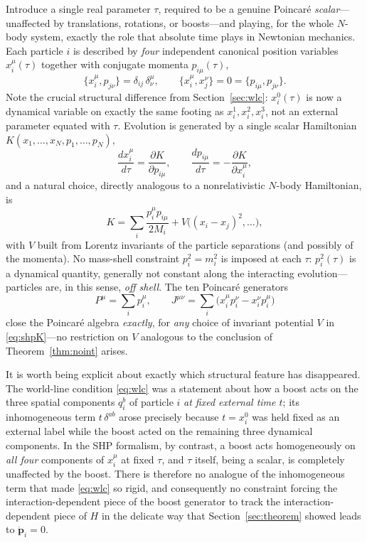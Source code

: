 Introduce a single real parameter $\tau$, required to be a genuine Poincar\'e
\emph{scalar}---unaffected by translations, rotations, or boosts---and playing,
for the whole $N$-body system, exactly the role that absolute time plays in
Newtonian mechanics. Each particle $i$ is described by \emph{four} independent
canonical position variables $x_i^\mu(\tau)$ together with conjugate momenta
$p_{i\mu}(\tau)$,
\begin{equation}
\{x_i^\mu,p_{j\nu}\} = \delta_{ij}\,\delta^\mu_\nu, \qquad \{x_i^\mu,x_j^\nu\}=0=\{p_{i\mu},p_{j\nu}\}.
\end{equation}
Note the crucial structural difference from Section~\ref{sec:wlc}:
$x_i^0(\tau)$ is now a dynamical variable on exactly the same footing as
$x_i^1,x_i^2,x_i^3$, not an external parameter equated with $\tau$. Evolution
is generated by a single scalar Hamiltonian $K(x_1,\dots,x_N,p_1,\dots,p_N)$,
\begin{equation}
\frac{dx_i^\mu}{d\tau} = \frac{\partial K}{\partial p_{i\mu}}, \qquad \frac{dp_{i\mu}}{d\tau} = -\frac{\partial K}{\partial x_i^\mu},
\end{equation}
and a natural choice, directly analogous to a nonrelativistic $N$-body Hamiltonian, is
\begin{equation}
K = \sum_i \frac{p_i^\mu p_{i\mu}}{2M_i} + V\big((x_i-x_j)^2,\dots\big),
\label{eq:shpK}
\end{equation}
with $V$ built from Lorentz invariants of the particle separations (and
possibly of the momenta). No mass-shell constraint $p_i^2=m_i^2$ is imposed at
each $\tau$: $p_i^2(\tau)$ is a dynamical quantity, generally not constant
along the interacting evolution---particles are, in this sense, \emph{off
shell}. The ten Poincar\'e generators
\begin{equation}
P^\mu=\sum_i p_i^\mu, \qquad J^{\mu\nu}=\sum_i\big(x_i^\mu p_i^\nu - x_i^\nu p_i^\mu\big)
\end{equation}
close the Poincar\'e algebra \emph{exactly}, for \emph{any} choice of invariant
potential $V$ in \eqref{eq:shpK}---no restriction on $V$ analogous to the
conclusion of Theorem~\ref{thm:noint} arises.


It is worth being explicit about exactly which structural feature has
disappeared. The world-line condition \eqref{eq:wlc} was a statement about how
a boost acts on the three spatial components $q_i^b$ of particle $i$ \emph{at
fixed external time $t$}; its inhomogeneous term $t\,\delta^{ab}$ arose
precisely because $t=x_i^0$ was held fixed as an external label while the boost
acted on the remaining three dynamical components. In the SHP formalism, by
contrast, a boost acts homogeneously on \emph{all four} components of $x_i^\mu$
at fixed $\tau$, and $\tau$ itself, being a scalar, is completely unaffected by
the boost. There is therefore no analogue of the inhomogeneous term that made
\eqref{eq:wlc} so rigid, and consequently no constraint forcing the
interaction-dependent piece of the boost generator to track the
interaction-dependent piece of $H$ in the delicate way that
Section~\ref{sec:theorem} showed leads to $\dot{{\bm p}}_i=0$.

